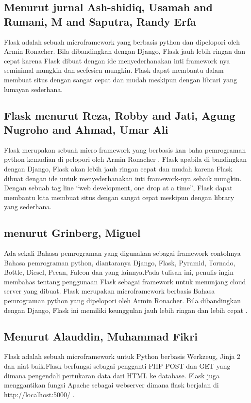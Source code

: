 \documentclass[12pt]{article}
\begin{document}
\subsection{Menurut jurnal Ash-shidiq, Usamah and Rumani, M and Saputra, Randy Erfa}
Flask adalah sebuah microframework yang berbasis python dan dipelopori oleh Armin Ronacher. Bila dibandingkan dengan Django, Flask jauh lebih ringan dan cepat karena Flask dibuat dengan ide menyederhanakan inti framework nya seminimal mungkin dan seefesien mungkin. Flask dapat membantu dalam membuat situs dengan sangat cepat dan mudah meskipun dengan librari yang lumayan sederhana\cite{ash2017perancangan}.

\subsection{Flask menurut Reza, Robby and Jati, Agung Nugroho and Ahmad, Umar Ali}
Flask merupakan sebuah micro framework yang berbasis kan baha pemrograman python kemudian di pelopori oleh Armin Ronacher . Flask apabila  di bandingkan dengan Django, Flask akan lebih jauh ringan  cepat dan mudah  karena  Flask  dibuat   dengan  ide  untuk menyederhanakan  inti  framework-nya  sebaik  mungkin. Dengan sebuah tag line “web development, one drop at a time”, Flask dapat membantu kita membuat situs dengan sangat cepat meskipun dengan library yang sederhana\cite{reza2016perancangan}.

\subsection{menurut Grinberg, Miguel}
Ada sekali Bahasa pemrograman yang digunakan sebagai framework contohnya Bahasa pemrograman python, diantaranya Django, Flask, Pyramid, Tornado, Bottle, Diesel, Pecan, Falcon dan yang lainnya.Pada tulisan ini, penulis ingin membahas tentang penggunaan Flask sebagai framework untuk menunjang cloud server yang dibuat. Flask merupakan microframework berbasis Bahasa pemrograman python yang dipelopori oleh Armin Ronacher. Bila dibandingkan dengan Django, Flask ini memiliki keunggulan jauh lebih ringan dan lebih cepat \cite{grinberg2018flask}.

\subsection{Menurut Alauddin, Muhammad Fikri}
Flask adalah sebuah microframework untuk Python berbasis Werkzeug, Jinja 2 dan niat baik.Flask berfungsi sebagai pengganti PHP POST dan GET yang dimana pengendali pertukaran data dari HTML ke database. Flask juga menggantikan fungsi Apache sebagai webserver dimana flask berjalan di http://localhost:5000/ \cite{alauddin2017implementasi}.
\end{document}
